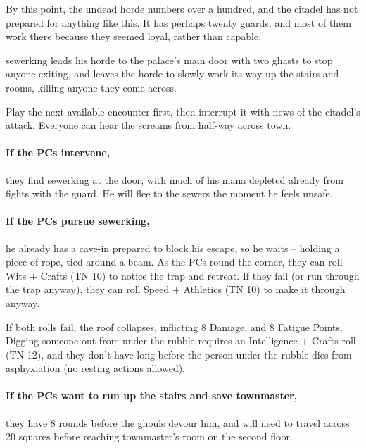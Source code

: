 \begin{multicols}{2}
By this point, the undead horde numbers over a hundred, and the citadel has not prepared for anything like this.
It has perhaps twenty guards, and most of them work there because they seemed loyal, rather than capable.

\Gls{sewerking} leads his horde to the palace's main door with two ghasts to stop anyone exiting, and leaves the horde to slowly work its way up the stairs and rooms, killing anyone they come across.

Play the next available encounter first, then interrupt it with news of the citadel's attack.
Everyone can hear the screams from half-way across \gls{town}.

\paragraph{If the PCs intervene,}
they find \gls{sewerking} at the door, with much of his mana depleted already from fights with the guard.
He will flee to the sewers the moment he feels unsafe.

\ghast

\ghast

\sewerking


\paragraph{If the PCs pursue \gls{sewerking},}
he already has a cave-in prepared to block his escape, so he waits -- holding a piece of rope, tied around a beam.
As the PCs round the corner, they can roll Wits + Crafts (TN 10) to notice the trap and retreat.
If they fail (or run through the trap anyway), they can roll Speed + Athletics (TN 10) to make it through anyway.

If both rolls fail, the roof collapses, inflicting 8 Damage, and 8 Fatigue Points.
Digging someone out from under the rubble requires an Intelligence + Crafts roll (TN 12), and they don't have long before the person under the rubble dies from asphyxiation (no resting actions allowed).

\paragraph{If the PCs want to run up the stairs and save \gls{townmaster},}
they have 8 rounds before the ghouls devour him, and will need to travel across 20 squares before reaching \gls{townmaster}'s room on the second floor.


\end{multicols}
